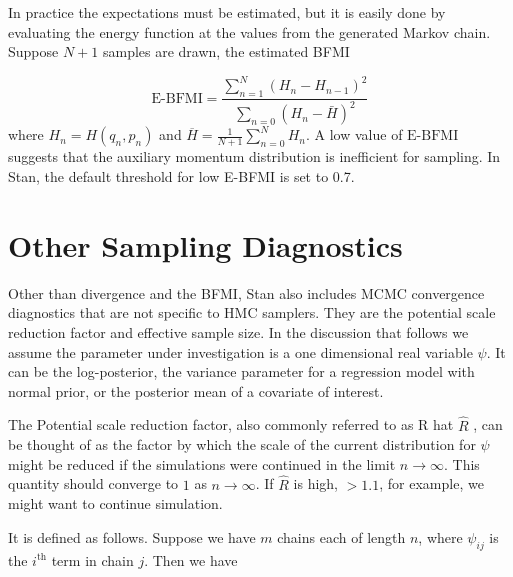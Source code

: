\documentclass[12pt]{report}
\begin{document}
 In practice the expectations must be estimated, but
it is easily done by evaluating the energy function at the values from the
generated Markov chain. Suppose $N+1$ samples are drawn, the estimated BFMI 

\[ \text{E-BFMI} = \frac{\sum_{n=1}^N(H_n-H_{n-1})^2}{\sum_{n=0}(H_n-\bar{H})^2} \]
where $H_n = H(q_n,p_n)$ and $\overline{H}=\frac{1}{N+1}\sum_{n=0}^N H_n$. A low value of $\text{E-BFMI}$ suggests that the auxiliary momentum distribution is
inefficient for sampling. In Stan, the default threshold for low E-BFMI is set to 0.7.

 
\section{Other Sampling Diagnostics}
\label{sec:otherdiag}
Other than divergence and the BFMI, Stan also includes MCMC convergence diagnostics that are not specific to HMC samplers. They are the potential scale reduction factor and effective sample size. In the discussion that follows we assume the parameter under investigation is a one dimensional real variable $\psi$. It can be the log-posterior, the variance parameter for a regression model with normal prior, or the posterior mean of a covariate of interest.


The Potential scale reduction factor, also commonly referred to as R hat $\hat{R}$ , can be thought of as the factor by which the scale of the current distribution for $\psi$ might be reduced if the simulations were continued in the limit $n \rightarrow \infty$. This quantity should converge to $1$ as $n \rightarrow \infty$. If $\hat{R}$ is high, $ > 1.1 $, for example, we might want to continue simulation. 

It is defined as follows. Suppose we have $m$ chains each of length $n$, where $\psi_{ij}$ is the $i^\text{th}$ term in chain $j$. Then we have 
\end{document}
